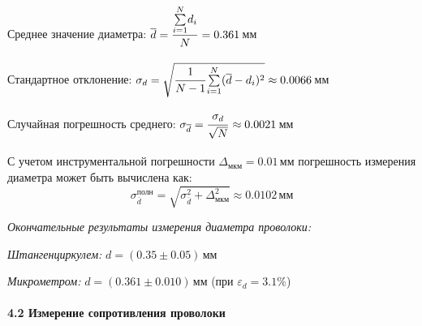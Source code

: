 \documentclass[12pt,a4paper]{scrartcl}
\begin{document}
	Среднее значение диаметра: $\overline{d} = \dfrac{\strut \overset{N}{\underset{i = 1}{\sum}} d_i}{\strut N} = 0.361\,$мм
	\par Стандартное отклонение: $\sigma_d = \sqrt{\dfrac{\strut 1}{\strut N-1}\overset{N}{\underset{i = 1}{\sum}} (\overline{d} - d_i)^2} \approx 0.0066\,$мм
	\par Случайная погрешность среднего: $\sigma_{\overline{d}} = \dfrac{\strut \sigma_d}{\strut \sqrt{N}} \approx 0.0021\,$мм
	\par С учетом инструментальной погрешности $\Delta_{\text{мкм}} = 0.01\,$мм погрешность измерения диаметра может быть вычислена как:
	$$\sigma_{\overline{d}}^{\text{полн}} = \sqrt{\sigma_{\overline{d}}^2 + \Delta_{\text{мкм}}^2} \approx 0.0102\,\text{мм}$$

	\textit{Окончательные результаты измерения диаметра проволоки:}
	\par \textit{Штангенциркулем:} $d = (0.35 \pm 0.05)\,$мм
	\par \textit{Микрометром:} $d = (0.361 \pm 0.010)\,$мм (при $\varepsilon_d = 3.1\%$)

	\paragraph{4.2 Измерение сопротивления проволоки} \hfill
\end{document}
